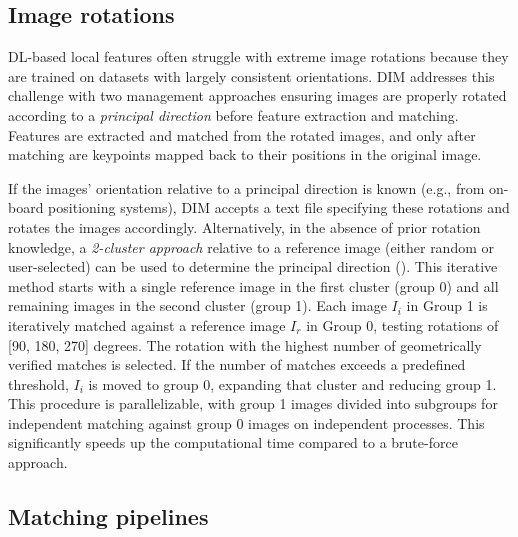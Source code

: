 \subsection{Image rotations}

DL-based local features often struggle with extreme image rotations because they are trained on datasets with largely consistent orientations. 
DIM addresses this challenge with two management approaches ensuring images are properly rotated according to a \textit{principal direction} before feature extraction and matching.
Features are extracted and matched from the rotated images, and only after matching are keypoints mapped back to their positions in the original image.

If the images' orientation relative to a principal direction is known (e.g., from on-board positioning systems), DIM accepts a text file specifying these rotations and rotates the images accordingly.
Alternatively, in the absence of prior rotation knowledge, a \textit{2-cluster approach} relative to a reference image (either random or user-selected) can be used to determine the principal direction ().
This iterative method starts with a single reference image in the first cluster (group 0) and all remaining images in the second cluster (group 1). 
Each image $I_i$ in Group 1 is iteratively matched against a reference image $I_r$ in Group 0, testing rotations of [90, 180, 270] degrees. 
The rotation with the highest number of geometrically verified matches is selected. 
If the number of matches exceeds a predefined threshold, $I_i$ is moved to group 0, expanding that cluster and reducing group 1. 
This procedure is parallelizable, with group 1 images divided into subgroups for independent matching against group 0 images on independent processes.
This significantly speeds up the computational time compared to a brute-force approach. 

\subsection{Matching pipelines}

